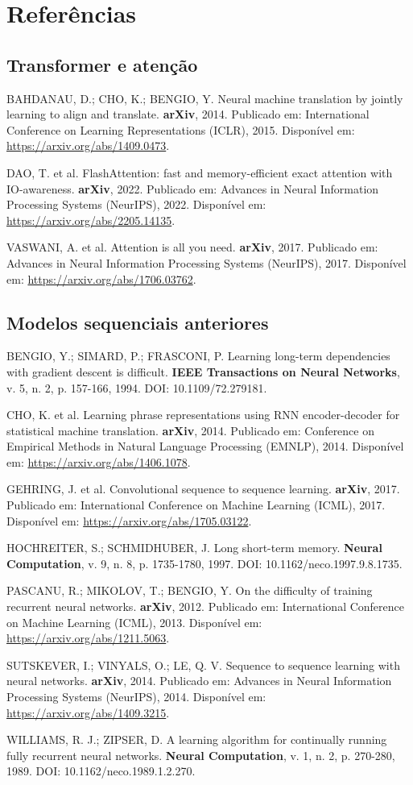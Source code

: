 \documentclass[11pt,a4paper]{article}
\begin{document}
\section{Referências}
\begingroup\small\raggedright
\subsection{Transformer e atenção}
BAHDANAU, D.; CHO, K.; BENGIO, Y. Neural machine translation by jointly learning to align and translate. \textbf{arXiv}, 2014. Publicado em: International Conference on Learning Representations (ICLR), 2015. Disponível em: \url{https://arxiv.org/abs/1409.0473}.\par
DAO, T. et al. FlashAttention: fast and memory-efficient exact attention with IO-awareness. \textbf{arXiv}, 2022. Publicado em: Advances in Neural Information Processing Systems (NeurIPS), 2022. Disponível em: \url{https://arxiv.org/abs/2205.14135}.\par
VASWANI, A. et al. Attention is all you need. \textbf{arXiv}, 2017. Publicado em: Advances in Neural Information Processing Systems (NeurIPS), 2017. Disponível em: \url{https://arxiv.org/abs/1706.03762}.\par
\subsection{Modelos sequenciais anteriores}
BENGIO, Y.; SIMARD, P.; FRASCONI, P. Learning long-term dependencies with gradient descent is difficult. \textbf{IEEE Transactions on Neural Networks}, v. 5, n. 2, p. 157-166, 1994. DOI: 10.1109/72.279181.\par
CHO, K. et al. Learning phrase representations using RNN encoder-decoder for statistical machine translation. \textbf{arXiv}, 2014. Publicado em: Conference on Empirical Methods in Natural Language Processing (EMNLP), 2014. Disponível em: \url{https://arxiv.org/abs/1406.1078}.\par
GEHRING, J. et al. Convolutional sequence to sequence learning. \textbf{arXiv}, 2017. Publicado em: International Conference on Machine Learning (ICML), 2017. Disponível em: \url{https://arxiv.org/abs/1705.03122}.\par
HOCHREITER, S.; SCHMIDHUBER, J. Long short-term memory. \textbf{Neural Computation}, v. 9, n. 8, p. 1735-1780, 1997. DOI: 10.1162/neco.1997.9.8.1735.\par
PASCANU, R.; MIKOLOV, T.; BENGIO, Y. On the difficulty of training recurrent neural networks. \textbf{arXiv}, 2012. Publicado em: International Conference on Machine Learning (ICML), 2013. Disponível em: \url{https://arxiv.org/abs/1211.5063}.\par
SUTSKEVER, I.; VINYALS, O.; LE, Q. V. Sequence to sequence learning with neural networks. \textbf{arXiv}, 2014. Publicado em: Advances in Neural Information Processing Systems (NeurIPS), 2014. Disponível em: \url{https://arxiv.org/abs/1409.3215}.\par
WILLIAMS, R. J.; ZIPSER, D. A learning algorithm for continually running fully recurrent neural networks. \textbf{Neural Computation}, v. 1, n. 2, p. 270-280, 1989. DOI: 10.1162/neco.1989.1.2.270.\par
\end{document}
